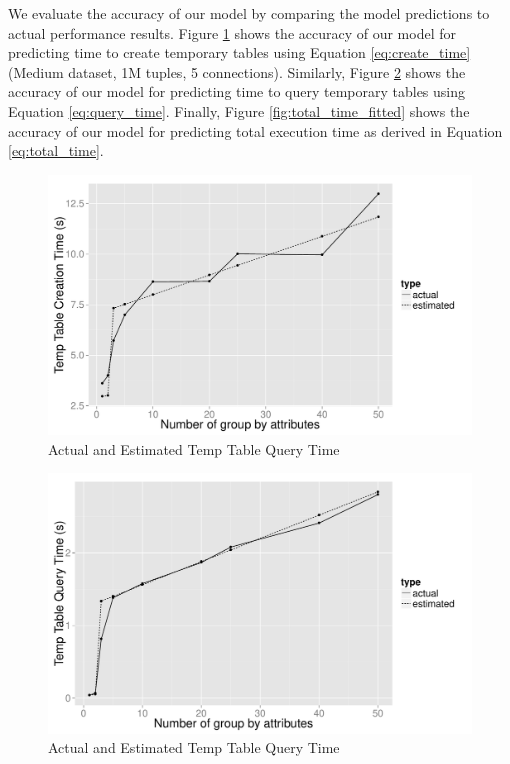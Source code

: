 We evaluate the accuracy of our model by comparing the model predictions to
actual performance results. Figure \ref{fig:create_time_fitted} shows the
accuracy of our model for predicting time to create temporary tables using
Equation \ref{eq:create_time} (Medium dataset, 1M tuples, 5 connections).
Similarly, Figure \ref{fig:query_time_fitted} shows the accuracy of our model
for predicting time to query temporary tables using Equation
\ref{eq:query_time}. Finally, Figure \ref{fig:total_time_fitted} shows the
accuracy of our model for predicting total execution time as derived in Equation
\ref{eq:total_time}.

\begin{figure}[h]
  \centering
    \includegraphics[width=12cm]{Images/create_time_fitted.pdf}
  \caption{Actual and Estimated Temp Table Query Time}
  \label{fig:create_time_fitted}
  
\end{figure}
\begin{figure}[h]
  \centering
    \includegraphics[width=12cm]{Images/query_time_fitted.pdf}
  \caption{Actual and Estimated Temp Table Query Time} 
  \label{fig:query_time_fitted}
\end{figure}


